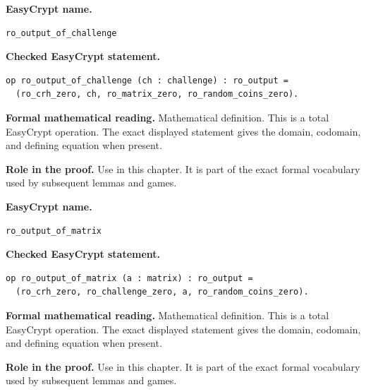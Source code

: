 \begin{formaldefinition}
\noindent\textbf{EasyCrypt name.}
\begin{lstlisting}[language=EasyCrypt,basicstyle=\ttfamily\scriptsize]
ro_output_of_challenge
\end{lstlisting}
\noindent\textbf{Checked EasyCrypt statement.}
\begin{lstlisting}[language=EasyCrypt,basicstyle=\ttfamily\scriptsize]
op ro_output_of_challenge (ch : challenge) : ro_output =
  (ro_crh_zero, ch, ro_matrix_zero, ro_random_coins_zero).
\end{lstlisting}
\noindent\textbf{Formal mathematical reading.}
Mathematical definition. This is a total EasyCrypt operation.  The exact displayed statement gives the domain, codomain, and defining equation when present.

\noindent\textbf{Role in the proof.}
Use in this chapter. It is part of the exact formal vocabulary used by subsequent lemmas and games.

\end{formaldefinition}

\begin{formaldefinition}
\noindent\textbf{EasyCrypt name.}
\begin{lstlisting}[language=EasyCrypt,basicstyle=\ttfamily\scriptsize]
ro_output_of_matrix
\end{lstlisting}
\noindent\textbf{Checked EasyCrypt statement.}
\begin{lstlisting}[language=EasyCrypt,basicstyle=\ttfamily\scriptsize]
op ro_output_of_matrix (a : matrix) : ro_output =
  (ro_crh_zero, ro_challenge_zero, a, ro_random_coins_zero).
\end{lstlisting}
\noindent\textbf{Formal mathematical reading.}
Mathematical definition. This is a total EasyCrypt operation.  The exact displayed statement gives the domain, codomain, and defining equation when present.

\noindent\textbf{Role in the proof.}
Use in this chapter. It is part of the exact formal vocabulary used by subsequent lemmas and games.

\end{formaldefinition}

